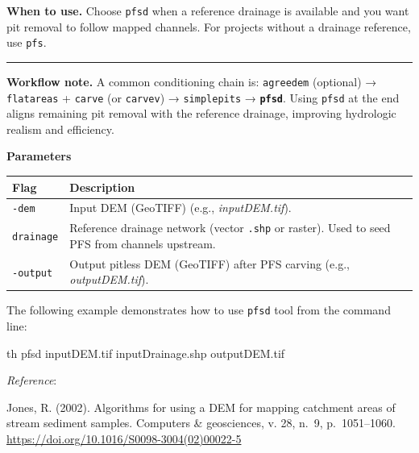 \documentclass[
]{book}
\newenvironment{Shaded}{\begin{snugshade}}{\end{snugshade}}
\newcommand{\ExtensionTok}[1]{#1}
\newcommand{\NormalTok}[1]{#1}
\begin{document}
\textbf{When to use.} Choose \texttt{pfsd} when a reference drainage is available and you want pit removal to follow mapped channels. For projects without a drainage reference, use \texttt{pfs}.

\begin{center}\rule{0.5\linewidth}{0.5pt}\end{center}

\textbf{Workflow note.} A common conditioning chain is:
\texttt{agreedem} (optional) → \texttt{flatareas} + \texttt{carve} (or \texttt{carvev}) → \texttt{simplepits} → \textbf{\texttt{pfsd}}.
Using \texttt{pfsd} at the end aligns remaining pit removal with the reference drainage, improving hydrologic realism and efficiency.

\textbf{Parameters}

\begin{longtable}[]{@{}
  >{\raggedright\arraybackslash}p{}
  >{\raggedright\arraybackslash}p{}@{}}
\toprule\noalign{}
\begin{minipage}[b]{\linewidth}\raggedright
Flag
\end{minipage} & \begin{minipage}[b]{\linewidth}\raggedright
Description
\end{minipage} \\
\midrule\noalign{}
\endhead
\bottomrule\noalign{}
\endlastfoot
\texttt{-dem} & Input DEM (GeoTIFF) (e.g., \emph{inputDEM.tif}). \\
\texttt{drainage} & Reference drainage network (vector \texttt{.shp} or raster). Used to seed PFS from channels upstream. \\
\texttt{-output} & Output pitless DEM (GeoTIFF) after PFS carving (e.g., \emph{outputDEM.tif}). \\
\end{longtable}

The following example demonstrates how to use \texttt{pfsd} tool from the command line:

\begin{Shaded}
\begin{Highlighting}[]
\ExtensionTok{th}\NormalTok{ pfsd inputDEM.tif inputDrainage.shp outputDEM.tif}
\end{Highlighting}
\end{Shaded}

\emph{Reference}:

Jones, R. (2002). Algorithms for using a DEM for mapping catchment areas of stream sediment samples. Computers \& geosciences, v. 28, n.~9, p.~1051--1060. \url{https://doi.org/10.1016/S0098-3004(02)00022-5}
\end{document}
